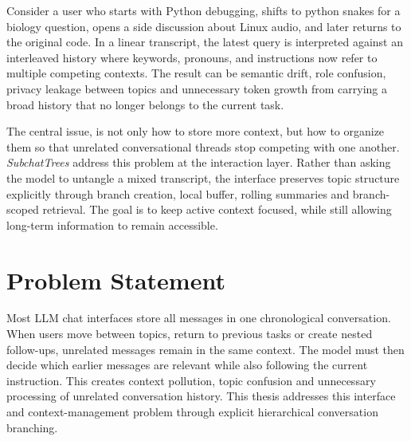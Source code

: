 Consider a user who starts with Python debugging, shifts to python snakes for a biology question, opens a side discussion about Linux audio, and later returns to the original code. In a linear transcript, the latest query is interpreted against an interleaved history where keywords, pronouns, and instructions now refer to multiple competing contexts. The result can be semantic drift, role confusion, privacy leakage between topics and unnecessary token growth from carrying a broad history that no longer belongs to the current task.







The central issue, is not only how to store more context, but how to organize them so that unrelated conversational threads stop competing with one another. \textit{SubchatTrees} address this problem at the interaction layer. Rather than asking the model to untangle a mixed transcript, the interface preserves topic structure explicitly through branch creation, local buffer, rolling summaries and branch-scoped retrieval. The goal is to keep active context focused, while still allowing long-term information to remain accessible.

\section{Problem Statement}
Most LLM chat interfaces store all messages in one chronological conversation. When users move between topics, return to previous tasks or create nested follow-ups, unrelated messages remain in the same context. The model must then decide which earlier messages are relevant while also following the current instruction. This creates context pollution, topic confusion and unnecessary processing of unrelated conversation history. This thesis addresses this interface and context-management problem through explicit hierarchical conversation branching.

